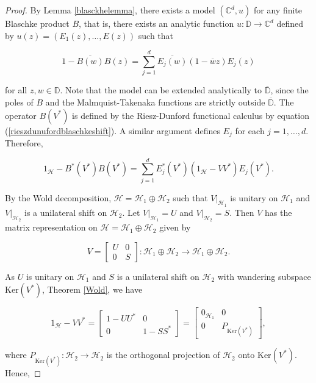 \documentclass[10pt, reqno]{amsart}
\theoremstyle{definition}
\numberwithin{equation}{section}
\begin{document}
\begin{proof}

By Lemma \ref{blasckhelemma}, there exists a model $(\mathbb{C}^{d},u)$ for any finite Blaschke product $B$, that is, there exists an analytic function $u:\mathbb{D}\rightarrow \mathbb{C}^{d}$ defined by $u(z) = (E_{1}(z),\hdots,E(z))$ such that

$$1-\overline{B(w)}B(z)=\sum_{j=1}^{d}\overline{E_{j}(w)}(1-\overline{w}z)E_{j}(z)$$

\noindent for all $z,w\in\mathbb{D}$. Note that the model can be extended analytically to $\overline{\mathbb{D}}$, since the poles of $B$ and the Malmquist-Takenaka functions are strictly outside $\overline{\mathbb{D}}$. The operator $B(V^{*})$ is defined by the Riesz-Dunford functional calculus by equation (\ref{rieszdunufordblaschkeshift}). A similar argument defines $E_{j}$ for each $j=1,\hdots,d$. Therefore, 

$$1_{\mathcal{H}}-B^{*}(V^{*})B(V^{*})=\sum_{j=1}^{d}E^{*}_{j}(V^{*})(1_{\mathcal{H}}-VV^{*})E_{j}(V^{*}).$$

By the Wold decomposition, $\mathcal{H}=\mathcal{H}_{1}\oplus\mathcal{H}_{2}$ such that $V|_{\mathcal{H}_{1}}$ is unitary on $\mathcal{H}_{1}$ and $V|_{\mathcal{H}_{2}}$ is a unilateral shift on $\mathcal{H}_{2}$. Let $V|_{\mathcal{H}_{1}}=U$ and $V|_{\mathcal{H}_{2}}=S$. Then $V$ has the matrix representation on $\mathcal{H}=\mathcal{H}_{1}\oplus\mathcal{H}_{2}$ given by

$$V=\begin{bmatrix}
U & 0\\
0 & S
\end{bmatrix}:\mathcal{H}_{1}\oplus\mathcal{H}_{2}\rightarrow\mathcal{H}_{1}\oplus\mathcal{H}_{2}.$$

\noindent As $U$ is unitary on $\mathcal{H}_{1}$ and $S$ is a unilateral shift on $\mathcal{H}_{2}$ with wandering subspace $\mathrm{Ker}(V^{*})$, Theorem \ref{Wold}, we have 

$$1_{\mathcal{H}}-VV^{*} = \begin{bmatrix}
1-UU^{*} & 0\\
0& 1-SS^{*}
\end{bmatrix} = \begin{bmatrix}
0_{\mathcal{H}_{1}} & 0\\
0& P_{\mathrm{Ker}(V^{*})}
\end{bmatrix},$$

\noindent  where $P_{\mathrm{Ker}(V^{*})}:\mathcal{H}_{2}\rightarrow\mathcal{H}_{2}$ is the orthogonal projection of $\mathcal{H}_{2}$ onto $\mathrm{Ker}(V^{*})$. Hence,


\end{proof}
\end{document}
